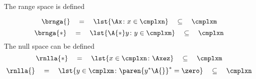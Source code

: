 The range space is defined \cite[p. 140]{Meyer2000} 

%
\begin{equation}
  \brnga{} \quad = \quad \lst{\Ax \colon x \in \cmplxn } \quad \subseteq \quad \cmplxm
\end{equation}
%
\begin{equation}
  \brnga{*} \quad = \quad \lst{\A{*}y \colon y \in \cmplxm } \quad \subseteq \quad \cmplxn
\end{equation}
%
The null space can be defined \cite[p. 174]{Meyer2000} 
%
\begin{equation}
  \rnlla{*} \quad = \quad \lst{x \in \cmplxn \colon \Axez } \quad \subseteq \quad \cmplxm
\end{equation}
%
\begin{equation}
  \rnlla{} \quad = \quad \lst{y \in \cmplxm \colon \paren{ y^{*}\A{} }^{*} = \zero } \quad \subseteq \quad \cmplxn
\end{equation}


\endinput